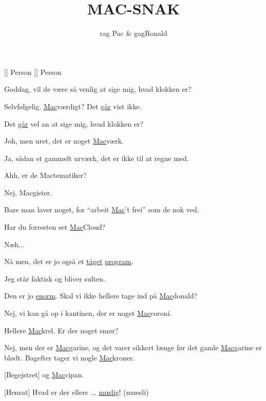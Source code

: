 \documentclass[a4paper,11pt]{article}
\title{MAC-SNAK}
\author{rag Pac \& gagRonald}
\begin{document}
\maketitle

\begin{roles}
[] Person
[] Person
\end{roles}


\begin{sketch}


 Goddag, vil de være så venlig at sige mig, hvad klokken er?

 Selvfølgelig. 
\underline{Mac}værdigt? Det \underline{går} vist ikke.

 Det \underline{går} vel an at sige mig, hvad klokken er?

 Joh, men uret, det er noget \underline{Mac}værk.

 Ja, sådan et gammelt urværk, det er ikke til at regne med.

 Ahh, er de Mactematiker?

 Nej, Macgister.

 Bare man laver noget, for ``arbeit \underline{Mac}'t frei'' som de nok
ved.

 Har du forresten set \underline{Mac}Cloud?

 Næh...

 Nå men, det er jo også et \underline{tåget} \underline{program}.

 Jeg står faktisk og bliver sulten. 

  Den er jo \underline{enorm}.  Skal vi ikke
hellere tage ind på \underline{Mac}donald?

 Nej, vi kan gå op i kantinen, der er noget \underline{Mac}coroni.

 Hellere \underline{Mac}krel. Er der noget smør?

 Nej, men der er \underline{Mac}garine,  og det varer
sikkert længe før det gamle \underline{Mac}garine er blødt. 
Bagefter tager vi nogle \underline{Mac}kroner.

[Begejstret] og \underline{Mac}cipan.

[Hensat] Hvad er der ellers ... \underline{muslig}! (muesli)


\end{sketch}
\end{document}
